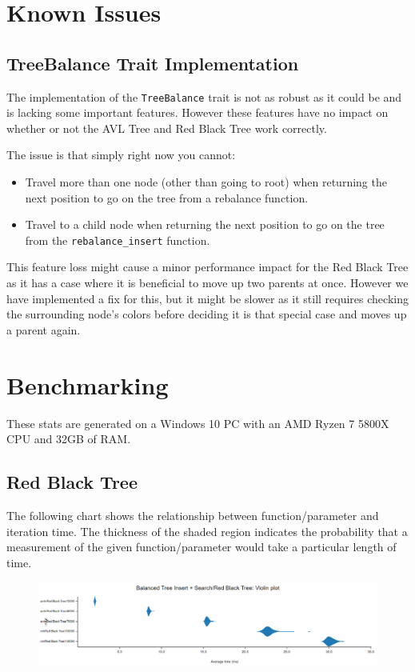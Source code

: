 \documentclass[11pt, letterpaper]{article}
\begin{document}
\section{Known Issues}

\subsection{TreeBalance Trait Implementation}
The implementation of the \texttt{TreeBalance} trait is not as robust as it could be and is lacking some important features.
However these features have no impact on whether or not the AVL Tree and Red Black Tree work correctly.

\noindent The issue is that simply right now you cannot:
\begin{itemize}
    \item Travel more than one node (other than going to root) when returning the next position to go on the tree from a rebalance function.
    \item Travel to a child node when returning the next position to go on the tree from the \texttt{rebalance_insert} function.
\end{itemize}

This feature loss might cause a minor performance impact for the Red Black Tree as it has a case where it is beneficial
to move up two parents at once.  However we have implemented a fix for this, but it might be slower as it still requires
checking the surrounding node's colors before deciding it is that special case and moves up a parent again.

\newpage 
\section{Benchmarking}
These stats are generated on a Windows 10 PC with an AMD Ryzen 7 5800X CPU and 32GB of RAM. 

\subsection{Red Black Tree}
The following chart shows the relationship between function/parameter and iteration time. The thickness of the shaded region indicates the probability that a measurement of the given function/parameter would take a particular length of time.
\begin{figure}[htbp]
    \centering
    \includegraphics[width=15cm]{benchmarks/Red_black_tree/violin.png}
    \label{Violin}
\end{figure}
\end{document}
